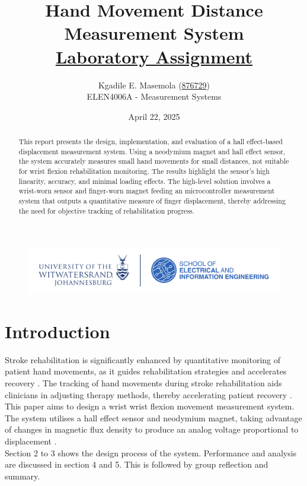 \documentclass[a4paper,12pt]{article}
\begin{document}
\begin{titlepage}
\begin{figure}
\centering
\includegraphics[scale=0.5]{witseie100logo.png}  
\end{figure}
\title{Hand Movement Distance Measurement System\\
\large \underline{Laboratory Assignment}}
\author{Kgadile E. Masemola (\underline{876729})\\ ELEN4006A - Measurement Systems}
\date{April 22, 2025}
\maketitle
%
\begin{abstract}
This report presents the design, implementation, and evaluation of a hall effect-based displacement measurement system. Using a neodymium magnet and hall effect sensor, the system accurately measures small hand movements for small distances, not suitable for wrist flexion rehabilitation monitoring. The results highlight the sensor's high linearity, accuracy, and minimal loading effects. The high-level solution involves a wrist-worn sensor and finger-worn magnet feeding an microcontroller measurement system that outputs a quantitative measure of finger displacement, thereby addressing the need for objective tracking of rehabilitation progress.
\end{abstract}
\end{titlepage}



%
\section{Introduction}
Stroke rehabilitation is significantly enhanced by quantitative monitoring of patient hand movements, as it guides rehabilitation strategies and accelerates recovery \cite{langhorne2011stroke}. The tracking of hand movements during stroke rehabilitation aids clinicians in adjusting therapy methods, thereby accelerating patient recovery \cite{veerbeek2014effects}. This paper aims to design a wrist wrist flexion movement measurement system. The system utilises a hall effect sensor and neodymium magnet, taking advantage of changes in magnetic flux density to produce an analog voltage proportional to displacement \cite{popovic2013hall}.\\
Section 2 to 3 shows the design process of the system. Performance and analysis are discussed in section 4 and 5. This is followed by group reflection and summary.
\end{document}

